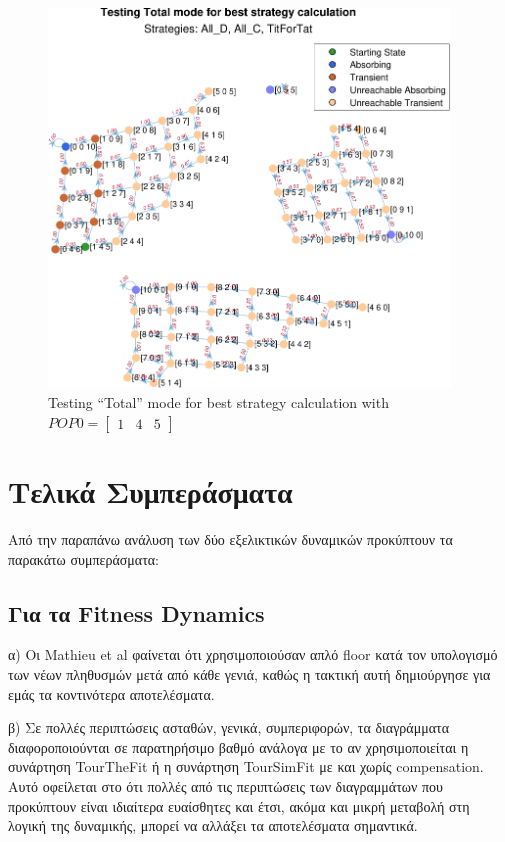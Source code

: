 \documentclass[12pt]{article}
\begin{document}
	\begin{figure}[h]
	      \centering
	      \includegraphics[width=0.95\textwidth]{Testing Total mode for best strategy calculation}
	      \caption{Testing ``Total'' mode for best strategy calculation with $POP0=\begin{bmatrix}1&4&5\end{bmatrix}$}
	      \label{fig:TourTheImiTotal}
	\end{figure}

\clearpage
\section{Τελικά Συμπεράσματα}
Από την παραπάνω ανάλυση των δύο εξελικτικών δυναμικών προκύπτουν τα παρακάτω συμπεράσματα:

\subsection*{Για τα Fitness Dynamics}
α) Οι Mathieu et al φαίνεται ότι χρησιμοποιούσαν απλό floor κατά τον υπολογισμό των νέων πληθυσμών μετά από κάθε γενιά, καθώς η τακτική αυτή δημιούργησε για εμάς τα κοντινότερα αποτελέσματα.

β) Σε πολλές περιπτώσεις ασταθών, γενικά, συμπεριφορών, τα διαγράμματα διαφοροποιούνται σε παρατηρήσιμο βαθμό ανάλογα με το αν χρησιμοποιείται η συνάρτηση TourTheFit ή η συνάρτηση TourSimFit με και χωρίς compensation. Αυτό οφείλεται στο ότι πολλές από τις περιπτώσεις των διαγραμμάτων που προκύπτουν είναι ιδιαίτερα ευαίσθητες και έτσι, ακόμα και μικρή μεταβολή στη λογική της δυναμικής, μπορεί να αλλάξει τα αποτελέσματα σημαντικά.
\end{document}
